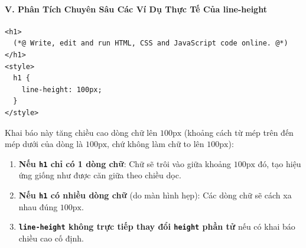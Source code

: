 \documentclass[11pt,oneside]{book}
\newcommand{\codeinline}[1]{\textcolor{accentOrange}{\texttt{#1}}}
\begin{document}
\paragraph*{V. Phân Tích Chuyên Sâu Các Ví Dụ Thực Tế Của line-height}

\begin{codeWindow}
\begin{lstlisting}[language=HTML5]
<h1>
  (*@ Write, edit and run HTML, CSS and JavaScript code online. @*)
</h1>
<style>
  h1 {
    line-height: 100px;
  }
</style>
\end{lstlisting}
\end{codeWindow}

\begin{conceptBox}
Khai báo này tăng chiều cao dòng chữ lên $100\text{px}$ (khoảng cách từ mép trên đến mép dưới của dòng là $100\text{px}$, chứ không làm chữ to lên $100\text{px}$):
\begin{enumerate}[leftmargin=1.5em, itemsep=3pt, parsep=0pt]
    \item \textbf{Nếu \codeinline{h1} chỉ có 1 dòng chữ}: Chữ sẽ trôi vào giữa khoảng $100\text{px}$ đó, tạo hiệu ứng giống như được căn giữa theo chiều dọc.
    \item \textbf{Nếu \codeinline{h1} có nhiều dòng chữ} (do màn hình hẹp): Các dòng chữ sẽ cách xa nhau đúng $100\text{px}$.
    \item \textbf{\codeinline{line-height} không trực tiếp thay đổi \codeinline{height} phần tử} nếu có khai báo chiều cao cố định.
\end{enumerate}
\end{conceptBox}
\end{document}
